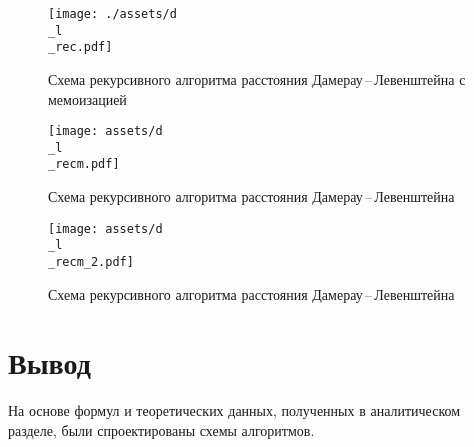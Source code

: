 \begin{figure}[ht!]
	\begin{center}
		\texttt{[image: ./assets/d\\\_l\\\_rec.pdf]}
	\end{center}
	
	\caption{Схема рекурсивного алгоритма расстояния Дамерау\,--\,Левенштейна с мемоизацией}
	\label{fig:damerau-mem}
\end{figure}

\begin{figure}[ht!]
	\begin{center}
		\texttt{[image: assets/d\\\_l\\\_recm.pdf]}
	\end{center}
	
	\caption{Схема рекурсивного алгоритма расстояния Дамерау\,--\,Левенштейна}
	\label{fig:damerau-rec}
\end{figure}

\begin{figure}[ht!]
	\begin{center}
		\texttt{[image: assets/d\\\_l\\\_recm\_2.pdf]}
	\end{center}
	
	\caption{Схема рекурсивного алгоритма расстояния Дамерау\,--\,Левенштейна}
	\label{fig:damerau-rec-Page-2}
\end{figure}



\section{Вывод}
На основе формул и теоретических данных, полученных в аналитическом разделе, были спроектированы схемы алгоритмов.